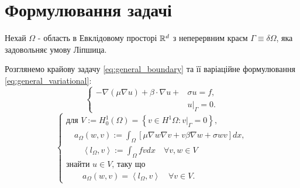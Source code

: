 \clearpage
\section{Формулювання задачі}

Нехай $\Omega$ - область в Евклідовому просторі $\mathbb{R}^d$ з неперервним краєм $\Gamma \equiv \delta \Omega$, яка задовольняє умову Ліпшица.

Розглянемо крайову задачу \eqref{eq:general_boundary} та її варіаційне формулювання \eqref{eq:general_variational}:
%
\begin{equation}\label{eq:general_boundary}
	\begin{cases}
			- \nabla (\mu \nabla u) + \beta \cdot \nabla u + &\sigma u = f,  \\
			&u|_\Gamma = 0.
	\end{cases}
\end{equation}
%
\begin{equation}\label{eq:general_variational}
	\begin{cases}
		\mbox{для } V := H_0^1 \left( \Omega \right) =
		\left\lbrace
			v \in H^1 \Omega : v|_\Gamma = 0
		\right\rbrace, \\

		\quad a_\Omega(w,v) := \displaystyle\int_\Omega
		\left[
			\mu \nabla w \nabla v +v \beta \nabla w + \sigma wv
		\right] dx, \\

		\qquad \left\langle l_\Omega, v \right\rangle := \displaystyle\int_\Omega fvdx \quad \forall v,w \in V \\

		\mbox{знайти }u \in V \mbox{, таку що} \\

		\qquad a_\Omega(w,v) = \left\langle l_\Omega, v \right\rangle \quad \forall v \in V.

	\end{cases}
\end{equation}

